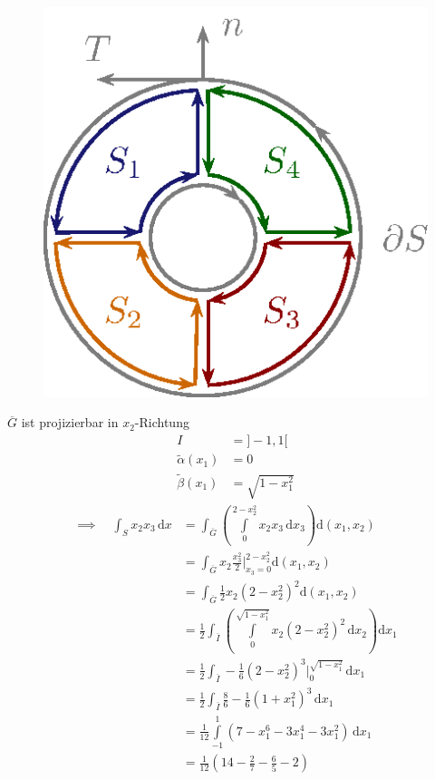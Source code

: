 \documentclass[a4paper,10pt]{scrbook}
\begin{document}
\begin{example}
  \begin{figure}[H]
    \centering
    \includegraphics[scale=0.2]{images/ana3-tmp-62}
  \end{figure}
  $\overline{G}$ ist projizierbar in $x_2$-Richtung
  \begin{align*}
    I &= ]-1,1[ \\
    \widetilde{\alpha}(x_1) &= 0 \\
    \widetilde{\beta}(x_1) &= \sqrt{1 - x_1^2}
  \end{align*}
  \begin{align*}
    \implies \quad \int_S x_2 x_3 \, \mathrm{d}x
    &= \int_{\overline{G}} \left( \int\limits_{0}^{2 - x_2^2} x_2 x_3 \, \mathrm{d}x_3 \right) \mathrm{d}(x_1,x_2) \\
    &= \int_{\overline{G}} x_2 \frac{x_3^2}{2} \bigg|_{x_3 = 0}^{2 - x_2^2} \mathrm{d}(x_1,x_2) \\
    &= \int_{\overline{G}} \frac{1}{2} x_2 (2 - x_2^2)^2 \mathrm{d}(x_1,x_2) \\
    &= \frac{1}{2} \int_{\overline{I}} \left( \int\limits_{0}^{\sqrt{1 - x_1^2}} x_2 (2 - x_2^2)^2 \, \mathrm{d}x_2 \right) \mathrm{d}x_1 \\
    &= \frac{1}{2} \int_{\overline{I}} -\frac{1}{6} (2 - x_2^2)^3 \bigg|_{0}^{\sqrt{1 - x_1^2}} \, \mathrm{d}x_1 \\
    &= \frac{1}{2} \int_{\overline{I}} \frac{8}{6} - \frac{1}{6} (1 + x_1^2)^3 \, \mathrm{d}x_1 \\
    &= \frac{1}{12} \int\limits_{-1}^{1} (7 - x_1^6 - 3 x_1^4 - 3 x_1^2) \, \mathrm{d}x_1 \\
    &= \frac{1}{12} (14 - \frac{2}{7} - \frac{6}{5} - 2)
  \end{align*}
\end{example}
\end{document}
